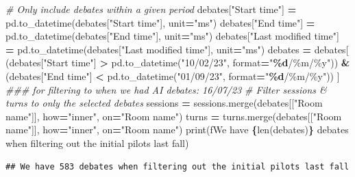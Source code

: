 \documentclass[
]{article}
\newenvironment{Shaded}{\begin{snugshade}}{\end{snugshade}}
\newcommand{\BuiltInTok}[1]{#1}
\newcommand{\CommentTok}[1]{\textcolor[rgb]{0.56,0.35,0.01}{\textit{#1}}}
\newcommand{\NormalTok}[1]{#1}
\newcommand{\OperatorTok}[1]{\textcolor[rgb]{0.81,0.36,0.00}{\textbf{#1}}}
\newcommand{\SpecialCharTok}[1]{\textcolor[rgb]{0.81,0.36,0.00}{\textbf{#1}}}
\newcommand{\SpecialStringTok}[1]{\textcolor[rgb]{0.31,0.60,0.02}{#1}}
\newcommand{\StringTok}[1]{\textcolor[rgb]{0.31,0.60,0.02}{#1}}
\begin{document}
\begin{Shaded}
\begin{Highlighting}[]
\CommentTok{\# Only include debates within a given period}
\NormalTok{debates[}\StringTok{"Start time"}\NormalTok{] }\OperatorTok{=}\NormalTok{ pd.to\_datetime(debates[}\StringTok{"Start time"}\NormalTok{], unit}\OperatorTok{=}\StringTok{"ms"}\NormalTok{)}
\NormalTok{debates[}\StringTok{"End time"}\NormalTok{] }\OperatorTok{=}\NormalTok{ pd.to\_datetime(debates[}\StringTok{"End time"}\NormalTok{], unit}\OperatorTok{=}\StringTok{"ms"}\NormalTok{)}
\NormalTok{debates[}\StringTok{"Last modified time"}\NormalTok{] }\OperatorTok{=}\NormalTok{ pd.to\_datetime(debates[}\StringTok{"Last modified time"}\NormalTok{], unit}\OperatorTok{=}\StringTok{"ms"}\NormalTok{)}
\NormalTok{debates }\OperatorTok{=}\NormalTok{ debates[}
\NormalTok{    (debates[}\StringTok{"Start time"}\NormalTok{] }\OperatorTok{\textgreater{}}\NormalTok{ pd.to\_datetime(}\StringTok{"10/02/23"}\NormalTok{, }\BuiltInTok{format}\OperatorTok{=}\StringTok{"}\SpecialCharTok{\%d}\StringTok{/\%m/\%y"}\NormalTok{)) }\OperatorTok{\&}
\NormalTok{    (debates[}\StringTok{"End time"}\NormalTok{] }\OperatorTok{\textless{}}\NormalTok{ pd.to\_datetime(}\StringTok{"01/09/23"}\NormalTok{, }\BuiltInTok{format}\OperatorTok{=}\StringTok{"}\SpecialCharTok{\%d}\StringTok{/\%m/\%y"}\NormalTok{))}
\NormalTok{]}
\CommentTok{\#\#\# for filtering to when we had AI debates: 16/07/23}
\CommentTok{\# Filter sessions \& turns to only the selected debates}
\NormalTok{sessions }\OperatorTok{=}\NormalTok{ sessions.merge(debates[[}\StringTok{"Room name"}\NormalTok{]], how}\OperatorTok{=}\StringTok{"inner"}\NormalTok{, on}\OperatorTok{=}\StringTok{"Room name"}\NormalTok{)}
\NormalTok{turns }\OperatorTok{=}\NormalTok{ turns.merge(debates[[}\StringTok{"Room name"}\NormalTok{]], how}\OperatorTok{=}\StringTok{"inner"}\NormalTok{, on}\OperatorTok{=}\StringTok{"Room name"}\NormalTok{)}
\BuiltInTok{print}\NormalTok{(}\SpecialStringTok{f\textquotesingle{}We have }\SpecialCharTok{\{}\BuiltInTok{len}\NormalTok{(debates)}\SpecialCharTok{\}}\SpecialStringTok{ debates when filtering out the initial pilots last fall\textquotesingle{}}\NormalTok{)}
\end{Highlighting}
\end{Shaded}

\begin{verbatim}
## We have 583 debates when filtering out the initial pilots last fall
\end{verbatim}
\end{document}
